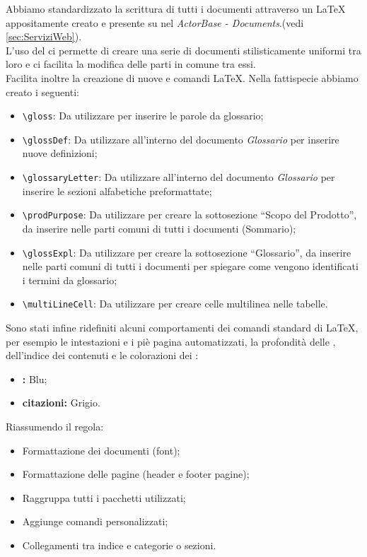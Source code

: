 \documentclass{scalatekids-article}
\begin{document}
\label{sec:strutturadoc}
Abbiamo standardizzato la scrittura di tutti i documenti attraverso un
 \LaTeX\xspace appositamente creato e presente su
\textit{} nel  \textit{ActorBase -
Documents}.(vedi \ref{sec:ServiziWeb}).\\ L'uso del  ci permette di creare una serie di documenti
stilisticamente uniformi tra loro e ci facilita la modifica delle parti in
comune tra essi.\\Facilita inoltre la creazione di nuove  e comandi
\LaTeX\xspace. Nella fattispecie abbiamo creato i seguenti:
\begin{itemize}
    \item\verb=\gloss=: Da utilizzare per inserire le parole da glossario;
    \item\verb=\glossDef=: Da utilizzare all'interno del documento \textit{Glossario} per inserire nuove definizioni;
    \item\verb=\glossaryLetter=: Da utilizzare all'interno del documento \textit{Glossario} per inserire le sezioni alfabetiche preformattate;
    \item\verb=\prodPurpose=: Da utilizzare per creare la sottosezione ``Scopo del Prodotto'', da inserire nelle parti comuni di tutti i documenti (Sommario);
    \item\verb=\glossExpl=: Da utilizzare per creare la sottosezione ``Glossario'', da inserire nelle parti comuni di tutti i documenti per spiegare come vengono identificati i termini da glossario;
    \item\verb=\multiLineCell=: Da utilizzare per creare celle multilinea nelle tabelle.
\end{itemize}
Sono stati infine ridefiniti alcuni comportamenti dei comandi standard di
\LaTeX\xspace, per esempio le intestazioni e i piè pagina automatizzati, la
profondità delle , dell'indice dei contenuti e le colorazioni dei
:
\begin{itemize}
    \item\textbf{:} Blu;
    \item\textbf{citazioni:} Grigio.
\end{itemize}
Riassumendo il  regola:
\begin{itemize}
    \item Formattazione dei documenti (font);
    \item Formattazione delle pagine (header e footer pagine);
    \item Raggruppa tutti i pacchetti utilizzati;
    \item Aggiunge comandi personalizzati;
    \item Collegamenti tra indice e categorie o sezioni.
\end{itemize}
\end{document}
